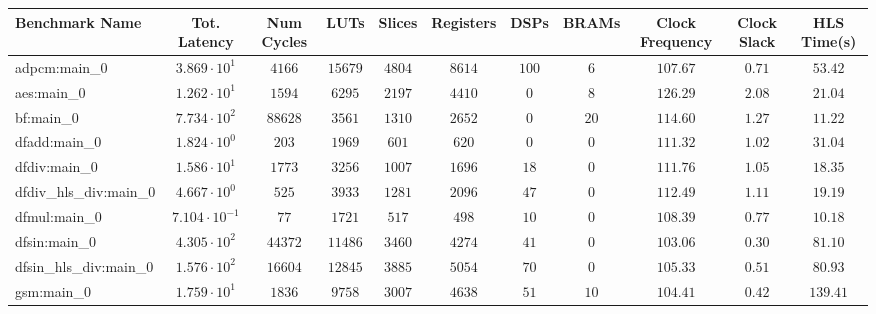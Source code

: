 \begin{tabular}{|l|c|c|c|c|c|c|c|c|c|c|}
\hline
Benchmark Name          & Tot. Latency            & Num Cycles & LUTs      & Slices    & Registers & DSPs    & BRAMs   & Clock Frequency & Clock Slack & HLS Time(s) \\
\hline
adpcm:main\_0           & $ 3.869 \cdot 10^{1}  $ & $ 4166   $ & $ 15679 $ & $ 4804  $ & $ 8614  $ & $ 100 $ & $ 6   $ & $ 107.67      $ & $ 0.71    $ & $ 53.42   $ \\
aes:main\_0             & $ 1.262 \cdot 10^{1}  $ & $ 1594   $ & $ 6295  $ & $ 2197  $ & $ 4410  $ & $ 0   $ & $ 8   $ & $ 126.29      $ & $ 2.08    $ & $ 21.04   $ \\
bf:main\_0              & $ 7.734 \cdot 10^{2}  $ & $ 88628  $ & $ 3561  $ & $ 1310  $ & $ 2652  $ & $ 0   $ & $ 20  $ & $ 114.60      $ & $ 1.27    $ & $ 11.22   $ \\
dfadd:main\_0           & $ 1.824 \cdot 10^{0}  $ & $ 203    $ & $ 1969  $ & $ 601   $ & $ 620   $ & $ 0   $ & $ 0   $ & $ 111.32      $ & $ 1.02    $ & $ 31.04   $ \\
dfdiv:main\_0           & $ 1.586 \cdot 10^{1}  $ & $ 1773   $ & $ 3256  $ & $ 1007  $ & $ 1696  $ & $ 18  $ & $ 0   $ & $ 111.76      $ & $ 1.05    $ & $ 18.35   $ \\
dfdiv\_hls\_div:main\_0 & $ 4.667 \cdot 10^{0}  $ & $ 525    $ & $ 3933  $ & $ 1281  $ & $ 2096  $ & $ 47  $ & $ 0   $ & $ 112.49      $ & $ 1.11    $ & $ 19.19   $ \\
dfmul:main\_0           & $ 7.104 \cdot 10^{-1} $ & $ 77     $ & $ 1721  $ & $ 517   $ & $ 498   $ & $ 10  $ & $ 0   $ & $ 108.39      $ & $ 0.77    $ & $ 10.18   $ \\
dfsin:main\_0           & $ 4.305 \cdot 10^{2}  $ & $ 44372  $ & $ 11486 $ & $ 3460  $ & $ 4274  $ & $ 41  $ & $ 0   $ & $ 103.06      $ & $ 0.30    $ & $ 81.10   $ \\
dfsin\_hls\_div:main\_0 & $ 1.576 \cdot 10^{2}  $ & $ 16604  $ & $ 12845 $ & $ 3885  $ & $ 5054  $ & $ 70  $ & $ 0   $ & $ 105.33      $ & $ 0.51    $ & $ 80.93   $ \\
gsm:main\_0             & $ 1.759 \cdot 10^{1}  $ & $ 1836   $ & $ 9758  $ & $ 3007  $ & $ 4638  $ & $ 51  $ & $ 10  $ & $ 104.41      $ & $ 0.42    $ & $ 139.41  $ \\

\end{tabular}
